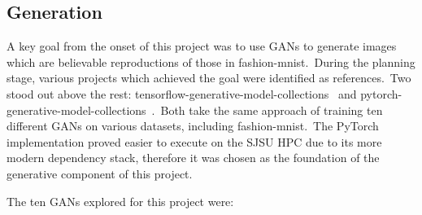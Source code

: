 \documentclass[conference]{IEEEtran}
\begin{document}
    \begin{figure}
        \caption{}
        \label{fig:classification-2}
    \end{figure}

    \subsection{Generation}\label{subsec:implementation-generation}

    A key goal from the onset of this project was to use GANs to generate images which are believable reproductions of those in fashion-mnist.\ During the planning stage, various projects which achieved the goal were identified as references.\ Two stood out above the rest: tensorflow-generative-model-collections~\cite{tensorflow-generative-model-collections} and pytorch-generative-model-collections~\cite{original-pytorch-generative-model-collections}.\ Both take the same approach of training ten different GANs on various datasets, including fashion-mnist.\ The PyTorch implementation proved easier to execute on the SJSU HPC due to its more modern dependency stack, therefore it was chosen as the foundation of the generative component of this project.

    The ten GANs explored for this project were:
\end{document}

